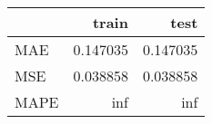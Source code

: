 \begin{tabular}{lrr}
\toprule
{} &     train &      test \\
\midrule
MAE  &  0.147035 &  0.147035 \\
MSE  &  0.038858 &  0.038858 \\
MAPE &       inf &       inf \\
\bottomrule
\end{tabular}
